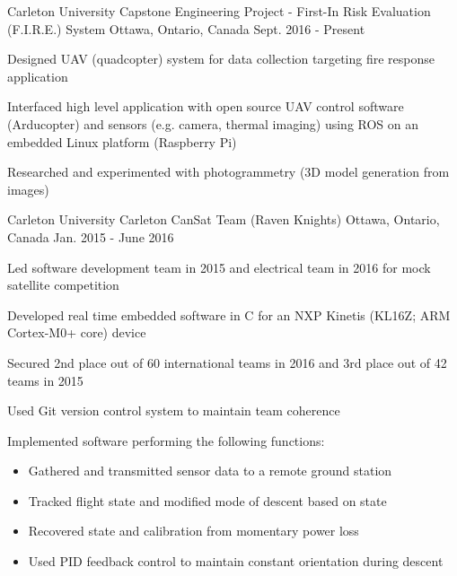 

\begin{cventries}

  \cventry
    {Carleton University} %
    {Capstone Engineering Project - First-In Risk Evaluation (F.I.R.E.) System} %
    {Ottawa, Ontario, Canada} %
    {Sept. 2016 - Present} %
    {
      \begin{cvitems} %
        \item {Designed UAV (quadcopter) system for data collection targeting fire response application}
        \item {Interfaced high level application with open source UAV control software (Arducopter) and sensors (e.g. camera, thermal imaging) using ROS on an embedded Linux platform (Raspberry Pi)}
        \item {Researched and experimented with photogrammetry (3D model generation from images)}
      \end{cvitems}
    }

  \cventry
    {Carleton University} %
    {Carleton CanSat Team (Raven Knights)} %
    {Ottawa, Ontario, Canada} %
    {Jan. 2015 - June 2016} %
    {
      \begin{cvitems} %
        \item {Led software development team in 2015 and electrical team in 2016 for mock satellite competition}
        \item {Developed real time embedded software in C for an NXP Kinetis (KL16Z; ARM Cortex-M0+ core) device}
        \item {Secured 2nd place out of 60 international teams in 2016 and 3rd place out of 42 teams in 2015}
        \item {Used Git version control system to maintain team coherence}
        \item {Implemented software performing the following functions:}
        \begin{itemize}
          \item {Gathered and transmitted sensor data to a remote ground station}
          \item {Tracked flight state and modified mode of descent based on state}
          \item {Recovered state and calibration from momentary power loss}
          \item {Used PID feedback control to maintain constant orientation during descent}
        \end{itemize}
      \end{cvitems}
    }


\end{cventries}
